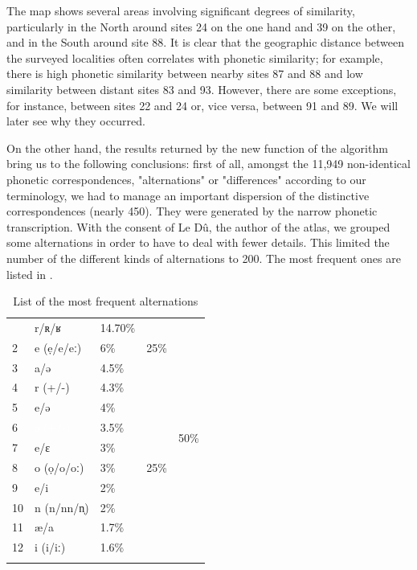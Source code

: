 \documentclass[output=paper]{LSP/langsci}
\begin{document}
The map shows several areas involving significant degrees of similarity, particularly in the North around sites 24 on the one hand and 39 on the other, and in the South around site 88. It is clear that the geographic distance between the surveyed localities often correlates with phonetic similarity; for example, there is high phonetic similarity between nearby sites 87 and 88 and low similarity between distant sites 83 and 93. However, there are some exceptions, for instance, between sites 22 and 24 or, vice versa, between 91 and 89. We will later see why they occurred.

On the other hand, the results returned by the new function of the algorithm bring us to the following conclusions: first of all, amongst the 11,949 non-identical phonetic correspondences, "alternations" or "differences" according to our terminology, we had to manage an important dispersion of the distinctive correspondences (nearly 450). They were generated by the narrow phonetic transcription. With the consent of Le Dû, the author of the atlas, we grouped some alternations in order to have to deal with fewer details. This limited the number of the different kinds of alternations to 200. The most frequent ones are listed in .

\begin{table}
\begin{tabular}{lllll}
\lsptoprule
 1 & {r/ʀ/ʁ} & 14.70\% & \multirow{3}{*}{25\%} & \multirow{12}{*}{50\%}\\
 2 & \cellcolor{gray!50}e (ẹ/e/eː) & 6\% &  & \\
 3 & a/ə & 4.5\% &  & \\
 \hhline{~~~-~}
 4 & r (+/-) & 4.3\% & \multirow{9}{*}{25\%} & \\
 5 & \cellcolor{gray!25}e/ə & 4\% &  & \\
 6 & \cellcolor{black!100}\textcolor{white}{ə (+/-)} & 3.5\% &  & \\
 7 & e/ɛ & 3\% &  & \\
 8 & o (ọ/o/oː) & 3\% &  & \\
 9 & e/i & 2\% &  & \\
 10 & n (n/nn/n̩) & 2\% &  & \\
 11 & æ/a & 1.7\% &  & \\
 12 & i (i/iː) & 1.6\% &  & \\
\lspbottomrule
\end{tabular}
\caption{List of the most frequent alternations}
\label{tab:4}
\end{table}
\end{document}
